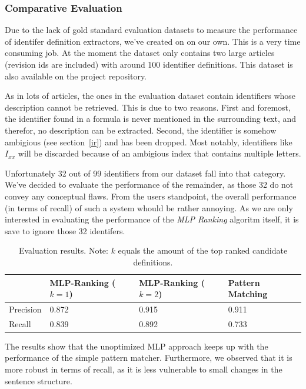 \documentclass[runningheads]{llncs}
\begin{document}
\subsubsection{Comparative Evaluation}

Due to the lack of gold standard evaluation datasets to measure the
performance of identifer definition extractors, we've created on on our own.
This is a very time consuming job. At the moment the dataset only contains two
large articles (revision ids are included) with around 100 identifier
definitions. This dataset is also available on the project repository.


As in lots of articles, the ones in the evaluation dataset contain identifiers
whose description cannot be retrieved. This is due to two reasons. First and
foremost, the identifier found in a formula is never mentioned in the
surrounding text, and therefor, no description can be extracted. Second, the
identifier is somehow ambigious (see section~\ref{ir}) and has been dropped. Most
notably, identifiers like $I_{xx}$ will be discarded because of an ambigious
index that contains multiple letters.


Unfortunately 32 out of 99 identifiers from our dataset fall into that category.
We've decided to evaluate the performance of the remainder, as those 32 do not
convey any conceptual flaws. From the users standpoint, the overall performance
(in terms of recall) of such a system whould be rather annoying. As we are only
interested in evaluating the performance of the \emph{MLP Ranking} algoritm itself,
it is save to ignore those 32 identifers.

\begin{table}[H]
\vspace{-5pt}
	\begin{center}
		\begin{tabular}{| l | l | l | l |}
			\hline
			 & MLP-Ranking ($k=1$) & MLP-Ranking ($k=2$) & Pattern Matching \\
			\hline
			Precision &  0.872  &  0.915  &  0.911  \\
			Recall    &  0.839  &  0.892  &  0.733  \\
			\hline
		\end{tabular}
	\end{center}
\caption{Evaluation results. Note: $k$ equals the amount of the top ranked candidate definitions.}
\vspace{-20pt}
\end{table}

The results show that the unoptimized MLP approach keeps up with the
performance of the simple pattern matcher. Furthermore, we observed that it is
more robust in terms of recall, as it is less vulnerable to small changes in
the sentence structure.
\end{document}
